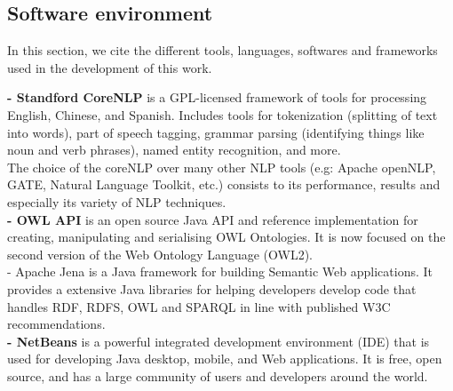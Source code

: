 \subsection{Software environment }
\label{chap_soft}
In this section, we cite the different tools, languages, softwares and frameworks used in the development of this work.

\textbf{- Standford CoreNLP} \cite{corenlp}
is a GPL-licensed framework of tools for processing English, Chinese, and Spanish. Includes tools for tokenization (splitting of text into words), part of speech tagging, grammar parsing (identifying things like noun and verb phrases), named entity recognition, and more.\\ 
The choice of the coreNLP over many other NLP tools (e.g: Apache openNLP, GATE, Natural Language Toolkit, etc.) consists to its performance, results and especially its variety of NLP techniques. \\ 

\textbf{- OWL API} \cite{owlapi} is an open source Java API and reference implementation for creating, manipulating and serialising OWL Ontologies. It is now focused on the second version of the Web Ontology Language (OWL2).\\

{- Apache Jena}\cite{jena} is a Java framework for building Semantic Web applications. It provides a extensive Java libraries for helping developers develop code that handles RDF, RDFS, OWL and SPARQL in line with published W3C recommendations. \\

\textbf{- NetBeans} is a powerful integrated development environment (IDE) that is used for developing Java desktop, mobile, and Web applications. It is free, open source, and has a large community of users and developers around the world. \\


